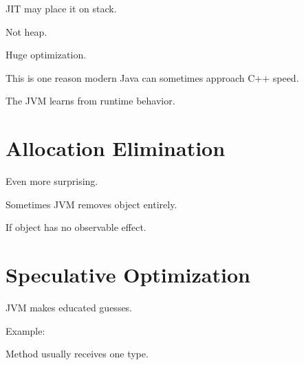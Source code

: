 \documentclass[11pt,a4paper]{book}
\begin{document}
JIT may place it on stack.


Not heap.


Huge optimization.


\begin{idea}

This is one reason modern Java
can sometimes approach C++ speed.


The JVM learns from runtime
behavior.

\end{idea}

\section{Allocation Elimination}

Even more surprising.


Sometimes JVM removes object
entirely.


If object has no observable effect.


\section{Speculative Optimization}

JVM makes educated guesses.


Example:


Method usually receives one type.

\end{document}

